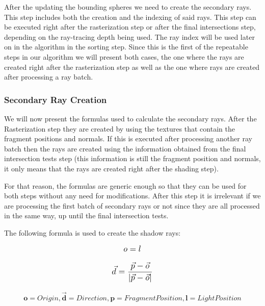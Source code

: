 After the updating the bounding spheres we need to create the secondary rays. This step includes both the creation and the indexing of said rays. This step can be executed right after the rasterization step or after the final intersections step, depending on the ray-tracing depth being used. The ray index will be used later on in the algorithm in the sorting step. Since this is the first of the repeatable steps in our algorithm we will present both cases, the one where the rays are created right after the rasterization step as well as the one where rays are created after processing a ray batch.

\subsubsection{Secondary Ray Creation}

We will now present the formulas used to calculate the secondary rays. After the Rasterization step they are created by using the textures that contain the fragment positions and normals. If this is executed after processing another ray batch then the rays are created using the information obtained from the final intersection tests step (this information is still the fragment position and normals, it only means that the rays are created right after the shading step). 

\medskip

For that reason, the formulas are generic enough so that they can be used for both steps without any need for modifications. After this step it is irrelevant if we are processing the first batch of secondary rays or not since they are all processed in the same way, up until the final intersection tests.

\pagebreak

The following formula is used to create the shadow rays:

\begin{equation}
    \mathlarger{o = l}
\end{equation}

\begin{equation}
    \mathlarger{\vec{d} = \frac{ \vec{p} - \vec{o} }
                               {|\vec{p} - \vec{o}|}}
\end{equation}                 

\begin{align*}
    \textbf{o} = Origin, \mathbf{\vec{d}} = Direction,                     
    \textbf{p} = Fragment Position,
    \textbf{l} = Light Position\\
\end{align*}
            

